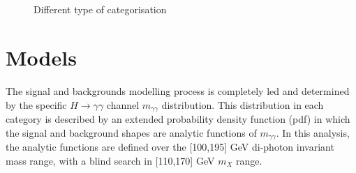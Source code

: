 \documentclass[a4paper, oneside, 11pt, openright]{book}
\begin{document}
 			\begin{figure}[h!]
 				\centering
 				\\
 				\\				
 				\caption{Different type of categorisation}
 				\label{fig:Cats}
 			\end{figure}
 		\section{Models}
 			The signal and backgrounds modelling process is completely led and determined by the specific $H\to\gamma\gamma$ channel $m_{\gamma\gamma}$ distribution. This distribution in each category is described by an extended probability density function (pdf) in which the signal and background shapes are analytic functions of $m_{\gamma\gamma}$. In this analysis, the analytic functions are defined over the [100,195] GeV di-photon invariant mass range, with a blind search in [110,170] GeV $m_X$ range. %
 			
\end{document}
